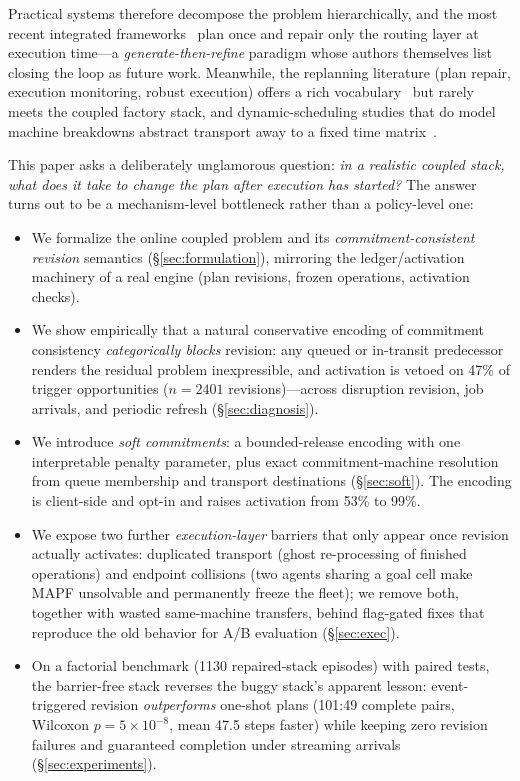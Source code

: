 \documentclass[twocolumn]{article}
\begin{document}
Practical systems therefore decompose the problem hierarchically, and the
most recent integrated frameworks~\cite{li2026framework} plan once and
repair only the routing layer at execution time---a
\emph{generate-then-refine} paradigm whose authors themselves list
closing the loop as future work. Meanwhile, the replanning literature
(plan repair, execution monitoring, robust execution) offers a rich
vocabulary~\cite{fox2006plan,domshlak2013satisficing} but rarely meets
the coupled factory stack, and dynamic-scheduling studies that do model
machine breakdowns abstract transport away to a fixed time
matrix~\cite{lu2025dynamic}.

This paper asks a deliberately unglamorous question: \emph{in a realistic
coupled stack, what does it take to change the plan after execution has
started?} The answer turns out to be a mechanism-level bottleneck rather
than a policy-level one:

\begin{itemize}
\item We formalize the online coupled problem and its
  \emph{commitment-consistent revision} semantics
  (\S\ref{sec:formulation}), mirroring the ledger/activation machinery of
  a real engine (plan revisions, frozen operations, activation checks).
\item We show empirically that a natural conservative encoding of commitment
  consistency \emph{categorically blocks} revision: any queued or
  in-transit predecessor renders the residual problem inexpressible, and
  activation is vetoed on 47\% of trigger opportunities ($n{=}2401$
  revisions)---across disruption revision, job arrivals, and periodic
  refresh (\S\ref{sec:diagnosis}).
\item We introduce \emph{soft commitments}: a bounded-release encoding
  with one interpretable penalty parameter, plus exact commitment-machine
  resolution from queue membership and transport destinations
  (\S\ref{sec:soft}). The encoding is client-side and opt-in and raises
  activation from 53\% to 99\%.
\item We expose two further \emph{execution-layer} barriers that only
  appear once revision actually activates: duplicated transport (ghost
  re-processing of finished operations) and endpoint collisions (two
  agents sharing a goal cell make MAPF unsolvable and permanently freeze
  the fleet); we remove both, together with wasted same-machine
  transfers, behind flag-gated fixes that reproduce the old behavior for
  A/B evaluation (\S\ref{sec:exec}).
\item On a factorial benchmark (1130 repaired-stack episodes) with
  paired tests, the barrier-free stack reverses the buggy stack's
  apparent lesson: event-triggered revision \emph{outperforms} one-shot
  plans (101:49 complete pairs, Wilcoxon $p=5\times10^{-8}$, mean 47.5
  steps faster) while keeping zero revision failures and guaranteed
  completion under streaming arrivals (\S\ref{sec:experiments}).
\end{itemize}
\end{document}

